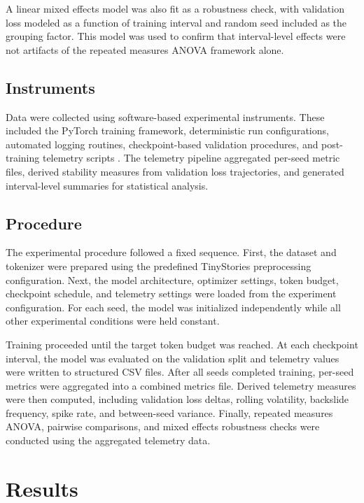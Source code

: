 \documentclass{article}
\begin{document}
A linear mixed effects model was also fit as a robustness check, with validation loss modeled as a function of training interval and random seed included as the grouping factor. This model was used to confirm that interval-level effects were not artifacts of the repeated measures ANOVA framework alone.

\subsection{Instruments}

Data were collected using software-based experimental instruments. These included the PyTorch training framework, deterministic run configurations, automated logging routines, checkpoint-based validation procedures, and post-training telemetry scripts \citep{dwyer2026_trainingdynamicscode}. The telemetry pipeline aggregated per-seed metric files, derived stability measures from validation loss trajectories, and generated interval-level summaries for statistical analysis.

\subsection{Procedure}

The experimental procedure followed a fixed sequence. First, the dataset and tokenizer were prepared using the predefined TinyStories preprocessing configuration. Next, the model architecture, optimizer settings, token budget, checkpoint schedule, and telemetry settings were loaded from the experiment configuration. For each seed, the model was initialized independently while all other experimental conditions were held constant.

Training proceeded until the target token budget was reached. At each checkpoint interval, the model was evaluated on the validation split and telemetry values were written to structured CSV files. After all seeds completed training, per-seed metrics were aggregated into a combined metrics file. Derived telemetry measures were then computed, including validation loss deltas, rolling volatility, backslide frequency, spike rate, and between-seed variance. Finally, repeated measures ANOVA, pairwise comparisons, and mixed effects robustness checks were conducted using the aggregated telemetry data.

\section{Results}
\end{document}
